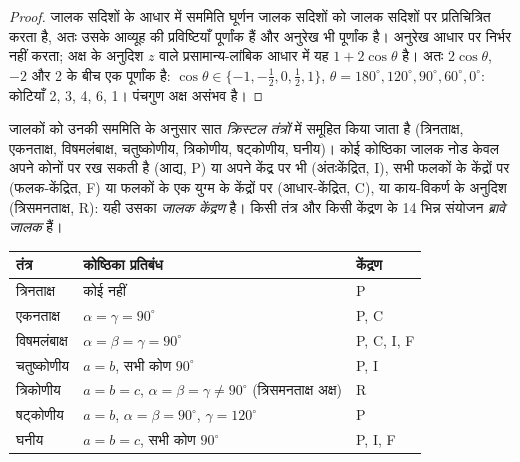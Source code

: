 \begin{proof}
जालक सदिशों के आधार में सममिति घूर्णन जालक सदिशों को जालक सदिशों पर
प्रतिचित्रित करता है, अतः उसके आव्यूह की प्रविष्टियाँ पूर्णांक हैं और अनुरेख भी पूर्णांक है।
अनुरेख आधार पर निर्भर नहीं करता; अक्ष के अनुदिश $z$ वाले प्रसामान्य-लांबिक आधार में
यह $1 + 2\cos\theta$ है। अतः $2\cos\theta$, $-2$ और 2 के बीच एक पूर्णांक है:
$\cos\theta \in \{-1, -\frac12, 0, \frac12, 1\}$, $\theta = 180^\circ, 120^\circ, 90^\circ,
60^\circ, 0^\circ$: कोटियाँ 2, 3, 4, 6, 1। पंचगुण अक्ष असंभव है।
\end{proof}

\begin{definition}[क्रिस्टल तंत्र, ब्रावे जालक, जालक केंद्रण]\label{def:b3:x-ray-diffraction:crystal-system}
जालकों को उनकी सममिति के अनुसार सात \emph{क्रिस्टल
तंत्रों} में समूहित किया जाता है (त्रिनताक्ष, एकनताक्ष, विषमलंबाक्ष, चतुष्कोणीय,
त्रिकोणीय, षट्कोणीय, घनीय)। कोई कोष्ठिका जालक नोड केवल अपने कोनों पर रख सकती है
(आद्य, P) या अपने केंद्र पर भी (अंतःकेंद्रित, I), सभी फलकों के केंद्रों पर
(फलक-केंद्रित, F) या फलकों के एक युग्म के केंद्रों पर (आधार-केंद्रित, C), या
काय-विकर्ण के अनुदिश (त्रिसमनताक्ष, R): यही उसका \emph{जालक
केंद्रण} है। किसी तंत्र और किसी केंद्रण के 14 भिन्न संयोजन
\emph{ब्रावे जालक} हैं।
\end{definition}

\begin{center}\small
\begin{tabular}{lll}
\hline
तंत्र & कोष्ठिका प्रतिबंध & केंद्रण \\ \hline
त्रिनताक्ष & कोई नहीं & P \\
एकनताक्ष & $\alpha = \gamma = 90^\circ$ & P, C \\
विषमलंबाक्ष & $\alpha = \beta = \gamma = 90^\circ$ & P, C, I, F \\
चतुष्कोणीय & $a = b$, सभी कोण $90^\circ$ & P, I \\
त्रिकोणीय & $a = b = c$, $\alpha = \beta = \gamma \ne 90^\circ$ (त्रिसमनताक्ष अक्ष) & R \\
षट्कोणीय & $a = b$, $\alpha = \beta = 90^\circ$, $\gamma = 120^\circ$ & P \\
घनीय & $a = b = c$, सभी कोण $90^\circ$ & P, I, F \\ \hline
\end{tabular}
\end{center}

